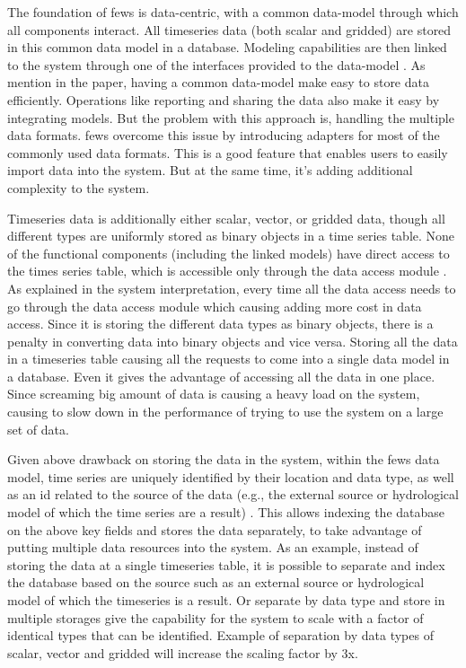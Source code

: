 The foundation of \acrshort{fews} is data-centric, with a common data-model through which all components interact. All timeseries data (both scalar and gridded) are stored in this common data model in a database. Modeling capabilities are then linked to the system through one of the interfaces provided to the data-model \cite{Werner2013TheSystem}. As mention in the paper, having a common data-model make easy to store data efficiently. Operations like reporting and sharing the data also make it easy by integrating models. But the problem with this approach is, handling the multiple data formats. \acrshort{fews} overcome this issue by introducing adapters for most of the commonly used data formats. This is a good feature that enables users to easily import data into the system. But at the same time, it's adding additional complexity to the system.

Timeseries data is additionally either scalar, vector, or gridded data, though all different types are uniformly stored as binary objects in a time series table. None of the functional components (including the linked models) have direct access to the times series table, which is accessible only through the data access module \cite{Werner2013TheSystem}. As explained in the system interpretation, every time all the data access needs to go through the data access module which causing adding more cost in data access. Since it is storing the different data types as binary objects, there is a penalty in converting data into binary objects and vice versa. Storing all the data in a timeseries table causing all the requests to come into a single data model in a database. Even it gives the advantage of accessing all the data in one place. Since screaming big amount of data is causing a heavy load on the system, causing to slow down in the performance of trying to use the system on a large set of data.

Given above drawback on storing the data in the system, within the \acrshort{fews} data model, time series are uniquely identified by their location and data type, as well as an id related to the source of the data (e.g., the external source or hydrological model of which the time series are a result) \cite{Werner2013TheSystem}. This allows indexing the database on the above key fields and stores the data separately, to take advantage of putting multiple data resources into the system. As an example, instead of storing the data at a single timeseries table, it is possible to separate and index the database based on the source such as an external source or hydrological model of which the timeseries is a result. Or separate by data type and store in multiple storages give the capability for the system to scale with a factor of identical types that can be identified. Example of separation by data types of scalar, vector and gridded will increase the scaling factor by 3x.

